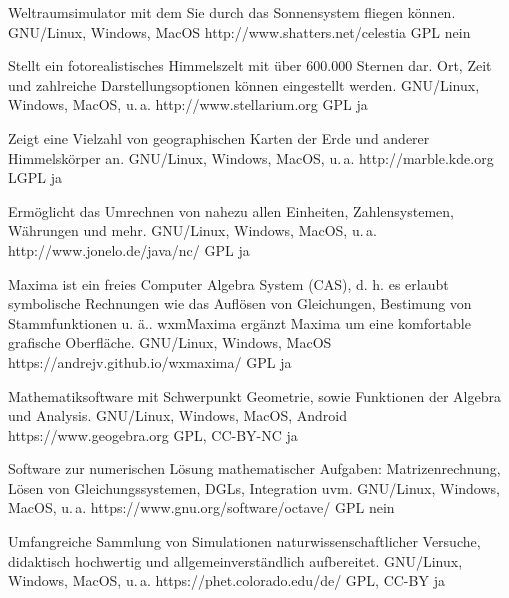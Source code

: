 




{Weltraumsimulator mit dem Sie durch das Sonnensystem fliegen können.}
{GNU/Linux, Windows, MacOS}
{http://www.shatters.net/celestia}
{GPL}
{nein}

{Stellt ein fotorealistisches Himmelszelt mit über 600.000 Sternen dar. Ort, Zeit und zahlreiche Darstellungsoptionen können eingestellt werden.}
{GNU/Linux, Windows, MacOS, u.\,a.}
{http://www.stellarium.org}
{GPL}
{ja}

{Zeigt eine Vielzahl von geographischen Karten der Erde und anderer Himmelskörper an.}
{GNU/Linux, Windows, MacOS, u.\,a.}
{http://marble.kde.org}
{LGPL}
{ja}

{Ermöglicht das Umrechnen von nahezu allen Einheiten, Zahlensystemen, Währungen und mehr.}
{GNU/Linux, Windows, MacOS, u.\,a.}
{http://www.jonelo.de/java/nc/}
{GPL}
{ja}

{Maxima ist ein freies Computer Algebra System (CAS), d. h. es erlaubt symbolische Rechnungen wie das Auflösen von Gleichungen, Bestimung von Stammfunktionen u. ä.. wxmMaxima ergänzt Maxima um eine komfortable grafische Oberfläche.}
{GNU/Linux, Windows, MacOS}
{https://andrejv.github.io/wxmaxima/}
{GPL}
{ja}

{Mathematiksoftware mit Schwerpunkt Geometrie, sowie Funktionen der Algebra und Analysis.}
{GNU/Linux, Windows, MacOS, Android}
{https://www.geogebra.org}
{GPL, CC-BY-NC}
{ja}

{Software zur numerischen Lösung mathematischer Aufgaben: Matrizenrechnung, Lösen von Gleichungssystemen, DGLs, Integration uvm.}
{GNU/Linux, Windows, MacOS, u.\,a.}
{https://www.gnu.org/software/octave/}
{GPL}
{nein}

{Umfangreiche Sammlung von Simulationen naturwissenschaftlicher Versuche, didaktisch hochwertig und allgemeinverständlich aufbereitet.}
{GNU/Linux, Windows, MacOS, u.\,a.}
{https://phet.colorado.edu/de/}
{GPL, CC-BY}
{ja}

\backpage


